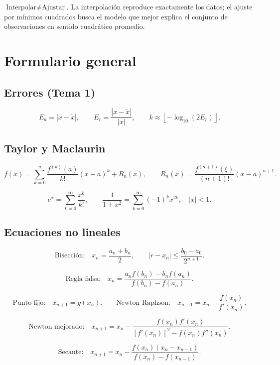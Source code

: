\documentclass[a4paper,12pt]{article}
\theoremstyle{definition}
\theoremstyle{plain}
\begin{document}
\begin{cajaresultado}
$\text{Interpolar} \neq \text{Ajustar}$.
La interpolación reproduce exactamente los datos; el ajuste por mínimos
cuadrados busca el modelo que mejor explica el conjunto de observaciones en
sentido cuadrático promedio.
\end{cajaresultado}

\newpage

\section{Formulario general}

\subsection{Errores (Tema 1)}

\[
E_a = |x-\tilde{x}|,
\qquad
E_r = \frac{|x-\tilde{x}|}{|x|},
\qquad
k \approx \left\lfloor -\log_{10}(2E_r)\right\rfloor.
\]

\subsection{Taylor y Maclaurin}

\[
f(x)=\sum_{k=0}^{n}\frac{f^{(k)}(a)}{k!}(x-a)^k+R_n(x),
\qquad
R_n(x)=\frac{f^{(n+1)}(\xi)}{(n+1)!}(x-a)^{n+1}.
\]

\[
e^x=\sum_{k=0}^\infty \frac{x^k}{k!},
\qquad
\frac{1}{1+x^2}=\sum_{k=0}^\infty (-1)^k x^{2k},\quad |x|<1.
\]

\subsection{Ecuaciones no lineales}

\[
\text{Bisección:}\quad x_n=\frac{a_n+b_n}{2},
\qquad
|r-x_n|\le \frac{b_0-a_0}{2^{n+1}}.
\]

\[
\text{Regla falsa:}\quad
x_n=\frac{a_n f(b_n)-b_n f(a_n)}{f(b_n)-f(a_n)}.
\]

\[
\text{Punto fijo:}\quad x_{n+1}=g(x_n).
\qquad
\text{Newton-Raphson:}\quad
x_{n+1}=x_n-\frac{f(x_n)}{f'(x_n)}.
\]

\[
\text{Newton mejorado:}\quad
x_{n+1}=x_n-\frac{f(x_n)f'(x_n)}{[f'(x_n)]^2-f(x_n)f''(x_n)}.
\]

\[
\text{Secante:}\quad
x_{n+1}=x_n-\frac{f(x_n)(x_n-x_{n-1})}{f(x_n)-f(x_{n-1})}.
\]
\end{document}
